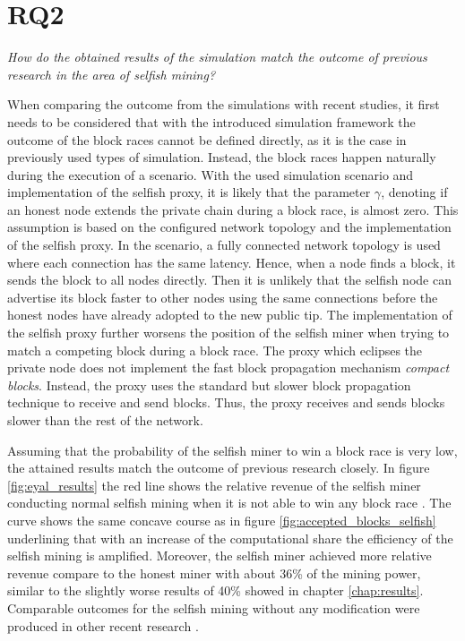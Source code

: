 \section{RQ2}

\textit{How do the obtained results of the simulation match the outcome of previous research in the area of selfish mining?}

When comparing the outcome from the simulations with recent studies, it first needs to be considered that with the introduced simulation framework the outcome of the block races cannot be defined directly, as it is the case in previously used types of simulation.
Instead, the block races happen naturally during the execution of a scenario.
With the used simulation scenario and implementation of the selfish proxy, it is likely that the parameter $\gamma$, denoting if an honest node extends the private chain during a block race, is almost zero.
This assumption is based on the configured network topology and the implementation of the selfish proxy.
In the scenario, a fully connected network topology is used where each connection has the same latency.
Hence, when a node finds a block, it sends the block to all nodes directly.
Then it is unlikely that the selfish node can advertise its block faster to other nodes using the same connections before the honest nodes have already adopted to the new public tip.
The implementation of the selfish proxy further worsens the position of the selfish miner when trying to match a competing block during a block race.
The proxy which eclipses the private node does not implement the fast block propagation mechanism \textit{compact blocks}.
Instead, the proxy uses the standard but slower block propagation technique to receive and send blocks.
Thus, the proxy receives and sends blocks slower than the rest of the network.

Assuming that the probability of the selfish miner to win a block race is very low, the attained results match the outcome of previous research closely.
In figure \ref{fig:eyal_results} the red line shows the relative revenue of the selfish miner conducting normal selfish mining when it is not able to win any block race \cite{eyal2014majority}.
The curve shows the same concave course as in figure \ref{fig:accepted_blocks_selfish} underlining that with an increase of the computational share the efficiency of the selfish mining is amplified.
Moreover, the selfish miner achieved more relative revenue compare to the honest miner with about 36\% of the mining power, similar to the slightly worse results of 40\% showed in chapter \ref{chap:results}.
Comparable outcomes for the selfish mining without any modification were produced in other recent research \cite{nayak2016stubborn, sapirshtein2016optimal}.

